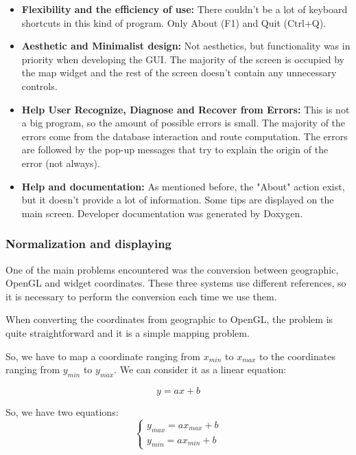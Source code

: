\documentclass{article}
\begin{document}
\begin{itemize}
	\item \textbf{Flexibility and the efficiency of use: }
	There couldn't be a lot of keyboard shortcuts in this kind of program. Only About (F1) and Quit (Ctrl+Q).
	
	\item \textbf{Aesthetic and Minimalist design: }
	Not aesthetics, but functionality was in priority when developing the GUI. The majority of the screen is occupied by the map widget and the rest of the screen doesn't contain any unnecessary controls.
	
	\item \textbf{Help User Recognize, Diagnose and Recover from Errors: }
	This is not a big program, so the amount of possible errors is small. The majority of the errors come from the database interaction and route computation. The errors are followed by the pop-up messages that try to explain the origin of the error (not always).
	
	\item \textbf{Help and documentation: }
	As mentioned before, the "About" action exist, but it doesn't provide a lot of information. Some tips are displayed on the main screen.
	Developer documentation was generated by Doxygen.
	
\end{itemize}

\subsubsection{Normalization and displaying}

One of the main problems encountered was the conversion between geographic, OpenGL and widget coordinates. These three systems use different references, so it is necessary to perform the conversion each time we use them.

When converting the coordinates from geographic to OpenGL, the problem is quite straightforward and it is a simple mapping problem.

So, we have to map a coordinate ranging from $x_{min}$ to $x_{max}$ to the coordinates ranging from $y_{min}$ to $y_{max}$. We can consider it as a linear equation:

\begin{equation}
y = ax + b
\end{equation}

So, we have two equations:
$$
\begin{cases}
y_{max} = ax_{max} + b \\
y_{min} = ax_{min} + b
\end{cases}
$$
\end{document}
